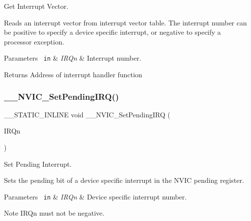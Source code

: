 Get Interrupt Vector. 

Reads an interrupt vector from interrupt vector table. The interrupt number can be positive to specify a device specific interrupt, or negative to specify a processor exception. 
\begin{DoxyParams}[1]{Parameters}
\mbox{\texttt{ in}}  & {\em I\+R\+Qn} & Interrupt number. \\
\hline
\end{DoxyParams}
\begin{DoxyReturn}{Returns}
Address of interrupt handler function 
\end{DoxyReturn}
\mbox{\label{group___c_m_s_i_s___core___n_v_i_c_functions_gaabefdd4b790b9a7308929938c0c1e1ad}} 
\subsubsection{\texorpdfstring{\_\_NVIC\_SetPendingIRQ()}{\_\_NVIC\_SetPendingIRQ()}}
{\footnotesize\ttfamily \+\_\+\+\_\+\+S\+T\+A\+T\+I\+C\+\_\+\+I\+N\+L\+I\+NE void \+\_\+\+\_\+\+N\+V\+I\+C\+\_\+\+Set\+Pending\+I\+RQ (\begin{DoxyParamCaption}\item[{I\+R\+Qn\+\_\+\+Type}]{I\+R\+Qn }\end{DoxyParamCaption})}



Set Pending Interrupt. 

Sets the pending bit of a device specific interrupt in the N\+V\+IC pending register. 
\begin{DoxyParams}[1]{Parameters}
\mbox{\texttt{ in}}  & {\em I\+R\+Qn} & Device specific interrupt number. \\
\hline
\end{DoxyParams}
\begin{DoxyNote}{Note}
I\+R\+Qn must not be negative. 
\end{DoxyNote}
\mbox{\label{group___c_m_s_i_s___core___n_v_i_c_functions_ga505338e23563a9c074910fb14e7d45fd}} 
